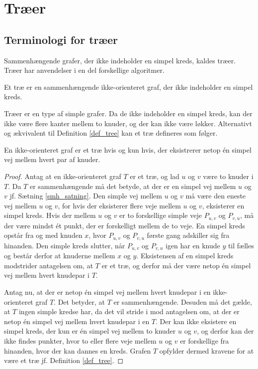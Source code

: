 \chapter{Træer}
\section{Terminologi for træer}

Sammenhængende grafer, der ikke indeholder en simpel kreds, kaldes træer. Træer har anvendelser i en del forskellige algoritmer.

\begin{defn}
Et træ er en sammenhængende ikke-orienteret graf, der ikke indeholder en simpel kreds.
\label{def_tree}
\end{defn}

Træer er en type af simple grafer. Da de ikke indeholder en simpel kreds, kan der ikke være flere kanter mellem to knuder, og der kan ikke være løkker. Alternativt og ækvivalent til Definition \ref{def_tree} kan et træ defineres som følger.

\begin{thm}
En ikke-orienteret graf er et træ hvis og kun hvis, der eksistrerer netop én simpel vej mellem hvert par af knuder. 
\end{thm}

\begin{proof}
	Antag at en ikke-orienteret graf $T$ er et træ, og lad $u$ og $v$ være to knuder i $T$. 
	Da $T$ er sammenhængende må det betyde, at der er en simpel vej mellem $u$ og $v$ jf. Sætning \ref{smh_satning}. 
	Den simple vej mellem $u$ og $v$ må være den eneste vej mellem $u$ og $v$, for hvis der eksisterer flere veje mellem $u$ og $v$, eksisterer en simpel kreds. 
	Hvis der mellem $u$ og $v$ er to forskellige simple veje $P_{u,v}$ og $P_{v,u}$, må der være mindst ét punkt, der er forskelligt mellem de to veje. 
	En simpel kreds opstår fra og med knuden $x$, hvor $P_{u,v}$ og $P_{v,u}$ første gang adskiller sig fra hinanden. 
	Den simple kreds slutter, når $P_{u,v}$ og $P_{v,u}$ igen har en knude $y$ til fælles og består derfor at knuderne mellem $x$ og $y$.
	Eksistensen af en simpel kreds modstrider antagelsen om, at $T$ er et træ, og derfor må der være netop én simpel vej mellem hvert knudepar i $T$.

Antag nu, at der er netop én simpel vej mellem hvert knudepar i en ikke-orienteret graf $T$.
	Det betyder, at $T$ er sammenhængende. Desuden må det gælde, at $T$ ingen simple kredse har, da det vil stride i mod antagelsen om, at der er netop én simpel vej mellem hvert knudepar i en $T$.
	Der kan ikke eksistere en simpel kreds, der kun er én simpel vej mellem to knuder $u$ og $v$, og derfor kan der ikke findes punkter, hvor to eller flere veje mellem $u$ og $v$ er forskellige fra hinanden, hvor der kan dannes en kreds.
	Grafen $T$ opfylder dermed kravene for at være et træ jf. Definition \ref{def_tree}.
\end{proof}

